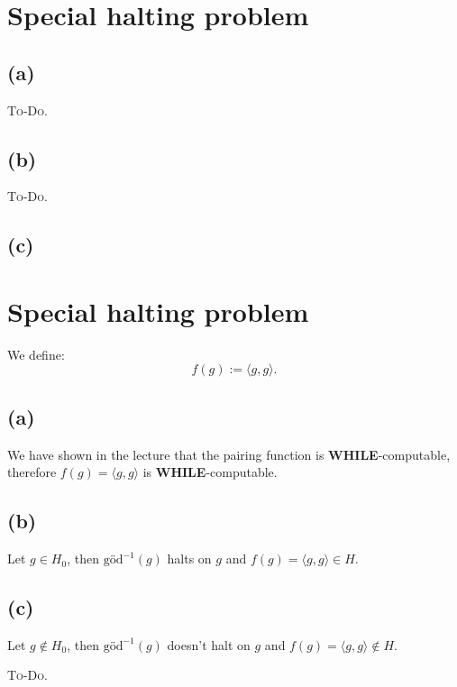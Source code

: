 

\setcounter{section}{2}


\section{Special halting problem}

\subsection{(a)}
\textsc{To-Do.}

\subsection{(b)}
\textsc{To-Do.}

\subsection{(c)}

\setcounter{section}{2}


\section{Special halting problem}

We define:
\[
f(g) := \langle g, g \rangle.
\]

\subsection*{(a)}
We have shown in the lecture that the pairing function is \textbf{WHILE}-computable, therefore $f(g) = \langle g, g \rangle$ is \textbf{WHILE}-computable.

\subsection*{(b)}
Let $g \in H_0$, then $\text{göd}^{-1}(g)$ halts on $g$ and $f(g) = \langle g, g \rangle \in H$.

\subsection*{(c)}
Let $g \notin H_0$, then $\text{göd}^{-1}(g)$ doesn’t halt on $g$ and $f(g) = \langle g, g \rangle \notin H$.




\textsc{To-Do.}



